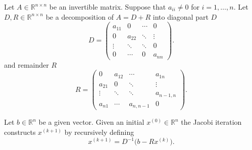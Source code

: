 \documentclass[]{article}
\begin{document}
Let $A\in\mathbb{R}^{n\times n}$ be an invertible matrix. Suppose that $a_{ii}\neq 0$ for $i=1,\dots,n$.
Let $D,R\in\mathbb{R}^{n\times n}$ be a decomposition of $A=D+R$ into diagonal part $D$
\[
D=
\begin{pmatrix}
a_{11} & 0      & \cdots & 0\\
0      & a_{22} & \ddots & \vdots\\
\vdots & \ddots & \ddots & 0\\
0      & \cdots & 0      & a_{nn}
\end{pmatrix}. \tag{5}
\]
and remainder $R$
\[
R=
\begin{pmatrix}
0      & a_{12} & \cdots & a_{1n}\\
a_{21} & 0      & \ddots & \vdots\\
\vdots & \ddots & \ddots & a_{n-1,n}\\
a_{n1} & \cdots & a_{n,n-1} & 0
\end{pmatrix}. \tag{6}
\]

Let $b\in\mathbb{R}^n$ be a given vector. Given an initial $x^{(0)}\in\mathbb{R}^n$ the Jacobi iteration constructs $x^{(k+1)}$ by recursively defining
\[
x^{(k+1)}=D^{-1}\bigl(b-Rx^{(k)}\bigr). \tag{7}
\]
\end{document}
